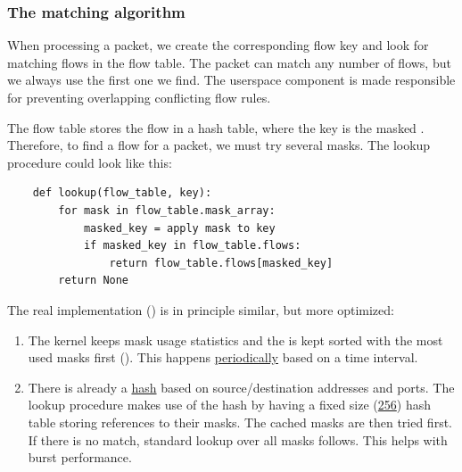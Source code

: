 \subsubsection{The matching algorithm}
\label{the-matching-algorithm}

When processing a packet, we create the corresponding flow key and look for matching flows in the flow table. The packet can match any number of flows, but we always use the first one we find. The userspace component is made responsible for preventing overlapping conflicting flow rules.

The flow table stores the flow in a hash table, where the key is the masked . Therefore, to find a flow for a packet, we must try several masks. The lookup procedure could look like this:

\begin{verbatim}
    def lookup(flow_table, key):
        for mask in flow_table.mask_array:
            masked_key = apply mask to key
            if masked_key in flow_table.flows:
                return flow_table.flows[masked_key]
        return None
\end{verbatim}
    

The real implementation (\href{https://elixir.bootlin.com/linux/v6.2.5/source/net/openvswitch/flow_table.c\#L785}{}) is in principle similar, but more optimized:

\begin{enumerate}
\def\labelenumi{\arabic{enumi}.}
\item
  The kernel keeps mask usage statistics and the  is
  kept sorted with the most used masks first
  (\href{https://elixir.bootlin.com/linux/v6.2.5/source/net/openvswitch/flow_table.c\#L1107}{}).
  This happens
  \href{https://elixir.bootlin.com/linux/v6.2.5/source/net/openvswitch/datapath.c\#L2536}{periodically}
  based on a time interval.
\item
  There is already a 
  \href{https://elixir.bootlin.com/linux/v6.2.5/source/include/linux/skbuff.h\#L1537}{hash}
  based on source/destination addresses and ports. The lookup procedure
  makes use of the hash by having a fixed size
  (\href{https://elixir.bootlin.com/linux/v6.2.5/source/net/openvswitch/flow_table.c\#L41}{256})
  hash table storing references to their masks. The cached masks are
  then tried first. If there is no match, standard lookup over all masks
  follows. This helps with burst performance.
\end{enumerate}

